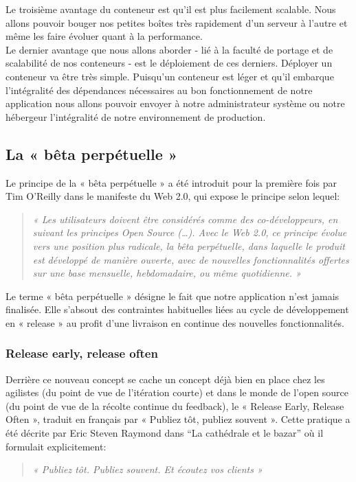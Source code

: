       Le troisième avantage du conteneur est qu’il est plus facilement scalable. Nous allons pouvoir bouger nos petites boîtes très rapidement d’un serveur à l’autre et même les faire évoluer quant à la performance.\\

      Le dernier avantage que nous allons aborder - lié à la faculté de portage et de scalabilité de nos conteneurs - est le déploiement de ces derniers. Déployer un conteneur va être très simple. Puisqu’un conteneur est léger et qu’il embarque l’intégralité des dépendances nécessaires au bon fonctionnement de notre application nous allons pouvoir envoyer à notre administrateur système ou notre hébergeur l’intégralité de notre environnement de production.

    \subsection{La « bêta perpétuelle »}
    Le principe de la « bêta perpétuelle » a été introduit pour la première fois par Tim O’Reilly dans le manifeste du Web 2.0, qui expose le principe selon lequel:\\
    \begin{quotation}
      \emph{« Les utilisateurs doivent être considérés comme des co-développeurs, en suivant les principes Open Source (…). Avec le Web 2.0, ce principe évolue vers une position plus radicale, la bêta perpétuelle, dans laquelle le produit est développé de manière ouverte, avec de nouvelles fonctionnalités offertes sur une base mensuelle, hebdomadaire, ou même quotidienne. »}\\
    \end{quotation}

    Le terme « bêta perpétuelle » désigne le fait que notre application n’est jamais finalisée. Elle s’absout des contraintes habituelles liées au cycle de développement en « release » au profit d’une livraison en continue des nouvelles fonctionnalités.

      \subsubsection{Release early, release often}
      Derrière ce nouveau concept se cache un concept déjà bien en place chez les agilistes (du point de vue de l’itération courte) et dans le monde de l’open source (du point de vue de la récolte continue du feedback), le « Release Early, Release Often », traduit en français par « Publiez tôt, publiez souvent ». Cette pratique a été décrite par Eric Steven Raymond dans “La cathédrale et le bazar” où il formulait explicitement:\\
      \begin{quotation}
        \emph{« Publiez tôt. Publiez souvent. Et écoutez vos clients »}\\
      \end{quotation}

